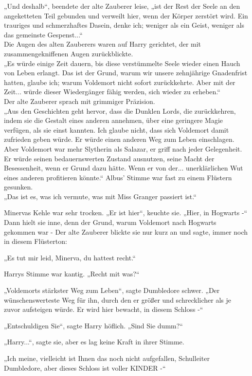 {„Und deshalb“, beendete der alte Zauberer leise, „ist der Rest der Seele an den angeketteten Teil gebunden und verweilt hier, wenn der Körper zerstört wird. Ein trauriges und schmerzhaftes Dasein, denke ich; weniger als ein Geist, weniger als das gemeinste Gespenst...“\\ Die Augen des alten Zauberers waren auf Harry gerichtet, der mit zusammengekniffenen Augen zurückblickte.\\ „Es würde einige Zeit dauern, bis diese verstümmelte Seele wieder einen Hauch von Leben erlangt. Das ist der Grund, warum wir unsere zehnjährige Gnadenfrist hatten, glaube ich; warum Voldemort nicht sofort zurückkehrte. Aber mit der Zeit... würde dieser Wiedergänger fähig werden, sich wieder zu erheben.“\\ Der alte Zauberer sprach mit grimmiger Präzision.\\ „Aus den Geschichten geht hervor, dass die Dunklen Lords, die zurückkehren, indem sie die Gestalt eines anderen annehmen, über eine geringere Magie verfügen, als sie einst kannten. Ich glaube nicht, dass sich Voldemort damit zufrieden geben würde. Er würde einen anderen Weg zum Leben einschlagen. Aber Voldemort war mehr Slytherin als Salazar, er griff nach jeder Gelegenheit. Er würde seinen bedauernswerten Zustand ausnutzen, seine Macht der Besessenheit, wenn er Grund dazu hätte. Wenn er von der... unerklärlichen Wut eines anderen profitieren könnte.“ Albus' Stimme war fast zu einem Flüstern gesunken.\\ „Das ist es, was ich vermute, was mit Miss Granger passiert ist.“

Minervas Kehle war sehr trocken. „Er ist hier“, keuchte sie. „Hier, in Hogwarts -“ Dann hielt sie inne, denn der Grund, warum Voldemort nach Hogwarts gekommen war - Der alte Zauberer blickte sie nur kurz an und sagte, immer noch in diesem Flüsterton:

„Es tut mir leid, Minerva, du hattest recht.“

Harrys Stimme war kantig. „Recht mit was?“

„Voldemorts stärkster Weg zum Leben“, sagte Dumbledore schwer. „Der wünschenswerteste Weg für ihn, durch den er größer und schrecklicher als je zuvor aufsteigen würde. Er wird hier bewacht, in diesem Schloss -“

„Entschuldigen Sie“, sagte Harry höflich. „Sind Sie dumm?“

„Harry...“, sagte sie, aber es lag keine Kraft in ihrer Stimme.

„Ich meine, vielleicht ist Ihnen das noch nicht aufgefallen, Schulleiter Dumbledore, aber dieses Schloss ist voller KINDER -“

}
